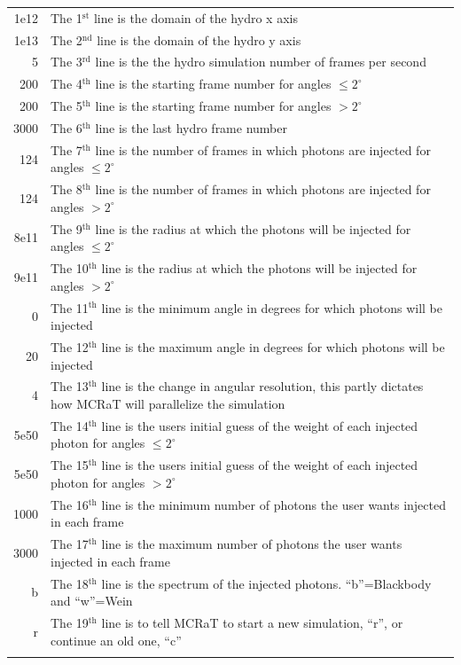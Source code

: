 \documentclass[12pt,a4paper]{article}
\begin{document}
\begin{tabularx}{\linewidth}{r X}
1e12 &   The 1$^\textrm{st}$ line is the domain of the hydro x axis \\ 
1e13 &   The 2$^\textrm{nd}$ line is the domain of the hydro y axis \\ 
5 &   The 3$^\textrm{rd}$ line is the the hydro simulation number of frames per second  \\ 
200 &    The 4$^\textrm{th}$ line is the starting frame number for angles $\le 2^\circ$\\ 
200 &   The 5$^\textrm{th}$ line is the starting frame number for angles $> 2^\circ$ \\ 
3000 &   The 6$^\textrm{th}$ line is the last hydro frame number \\ 
124 &    The 7$^\textrm{th}$ line is the number of frames in which photons are injected for angles $\le 2^\circ$\\ 
124 &   The 8$^\textrm{th}$ line is the number of frames in which photons are injected for angles $> 2^\circ$ \\ 
8e11 &    The 9$^\textrm{th}$ line is the radius at which the photons will be injected for angles $\le 2^\circ$\\ 
9e11 &   The 10$^\textrm{th}$ line is the radius at which the photons will be injected for angles $> 2^\circ$ \\ 
0 &   The 11$^\textrm{th}$ line is the minimum angle in degrees for which photons will be injected \\ 
20 &   The 12$^\textrm{th}$ line is the maximum angle in degrees for which photons will be injected \\ 
4 &   The 13$^\textrm{th}$ line is the change in angular resolution, this partly dictates how MCRaT will parallelize the simulation \\ 
5e50 &   The 14$^\textrm{th}$ line is the users initial guess of the weight of each injected photon for angles $\le 2^\circ$ \\ 
5e50 &    The 15$^\textrm{th}$ line is the users initial guess of the weight of each injected photon for angles $> 2^\circ$\\ 
1000 &   The 16$^\textrm{th}$ line is the minimum number of photons the user wants injected in each frame \\ 
3000 &    The 17$^\textrm{th}$ line is the maximum number of photons the user wants injected in each frame\\ 
b &   The 18$^\textrm{th}$ line is the spectrum of the injected photons. ``b''=Blackbody and ``w''=Wein \\ 
r &    The 19$^\textrm{th}$ line is to tell MCRaT to start a new simulation, ``r'', or continue an old one, ``c'' \\ \newline
\end{tabularx} 
\end{document}
